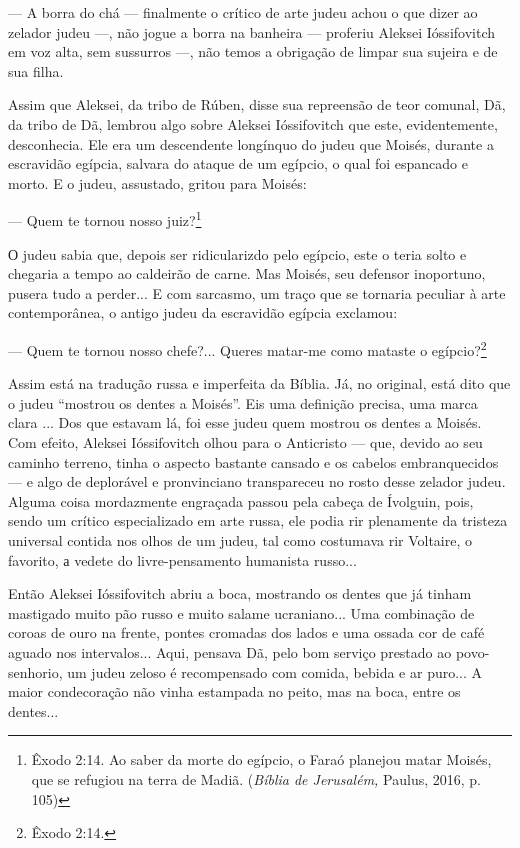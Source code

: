 --- A borra do chá --- finalmente o crítico de arte judeu achou o que
dizer ao zelador judeu ---, não jogue a borra na banheira --- proferiu
Aleksei Ióssifovitch em voz alta, sem sussurros ---, não temos a
obrigação de limpar sua sujeira e de sua filha.

Assim que Aleksei, da tribo de Rúben, disse sua repreensão de teor
comunal, Dã, da tribo de Dã, lembrou algo sobre Aleksei Ióssifovitch que
este, evidentemente, desconhecia. Ele era um descendente longínquo do
judeu que Moisés, durante a escravidão egípcia, salvara do ataque de um
egípcio, o qual foi espancado e morto. E o judeu, assustado, gritou para
Moisés:

--- Quem te tornou nosso juiz?\footnote{Êxodo 2:14. Ao saber da morte do
  egípcio, o Faraó planejou matar Moisés, que se refugiou na terra de
  Madiã. (\emph{Bíblia de Jerusalém,} Paulus, 2016, p. 105)}

О judeu sabia que, depois ser ridicularizdo pelo egípcio, este o teria
solto e chegaria a tempo ao caldeirão de carne. Mas Moisés, seu defensor
inoportuno, pusera tudo a perder... E com sarcasmo, um traço que se
tornaria peculiar à arte contemporânea, o antigo judeu da escravidão
egípcia exclamou:

--- Quem te tornou nosso chefe?... Queres matar-me como mataste o
egípcio?\footnote{Êxodo 2:14.}

Assim está na tradução russa e imperfeita da Bíblia. Já, no original,
está dito que o judeu ``mostrou os dentes a Moisés''. Eis uma definição
precisa, uma marca clara ... Dos que estavam lá, foi esse judeu quem
mostrou os dentes a Moisés. Com efeito, Aleksei Ióssifovitch olhou para
o Anticristo --- que, devido ao seu caminho terreno, tinha o aspecto
bastante cansado e os cabelos embranquecidos --- e algo de deplorável e
pronvinciano transpareceu no rosto desse zelador judeu. Alguma coisa
mordazmente engraçada passou pela cabeça de Ívolguin, pois, sendo um
crítico especializado em arte russa, ele podia rir plenamente da
tristeza universal contida nos olhos de um judeu, tal como costumava rir
Voltaire, o favorito, а vedete do livre-pensamento humanista russo...

Então Aleksei Ióssifovitch abriu a boca, mostrando os dentes que já
tinham mastigado muito pão russo e muito salame ucraniano... Uma
combinação de coroas de ouro na frente, pontes cromadas dos lados e uma
ossada cor de café aguado nos intervalos... Aqui, pensava Dã, pelo bom
serviço prestado ao povo-senhorio, um judeu zeloso é recompensado com
comida, bebida e ar puro... A maior condecoração não vinha estampada no
peito, mas na boca, entre os dentes...

